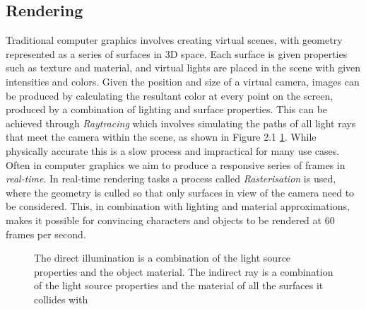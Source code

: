 \documentclass[ %
                    author={Gavin Parker},
                supervisor={Dr. Neill Campbell},
                    degree={MEng},
                     title={Deep Siamese Networks for Illumination Estimation from Stereo Images},
                  subtitle={},
                      type={research},
                      year={2018} ]{dissertation}
\begin{document}
\subsection{Rendering}
Traditional computer graphics involves creating virtual scenes, with geometry represented as a series of surfaces in 3D space. Each surface is given properties such as texture and material, and virtual lights are placed in the scene with given intensities and colors. Given the position and size of a virtual camera, images can be produced by calculating the resultant color at every point on the screen, produced by a combination of lighting and surface properties. This can be achieved through \textit{Raytracing} which involves simulating the paths of all light rays that meet the camera within the scene, as shown in Figure 2.1 \ref{raytracing}. While physically accurate this is a slow process and impractical for many use cases. Often in computer graphics we aim to produce a responsive series of frames in \textit{real-time}. In real-time rendering tasks a process called \textit{Rasterisation} is used, where the geometry is culled so that only surfaces in view of the camera need to be considered. This, in combination with lighting and material approximations, makes it possible for convincing characters and objects to be rendered at 60 frames per second.
\newpage
\begin{center}
\begin{figure}[H]
\centering
{}
\label{raytracing}
\caption{The direct illumination is a combination of the light source properties and the object material. The indirect ray is a combination of the light source properties and the material of all the surfaces it collides with}
\end{figure}
\end{center}
\end{document}
